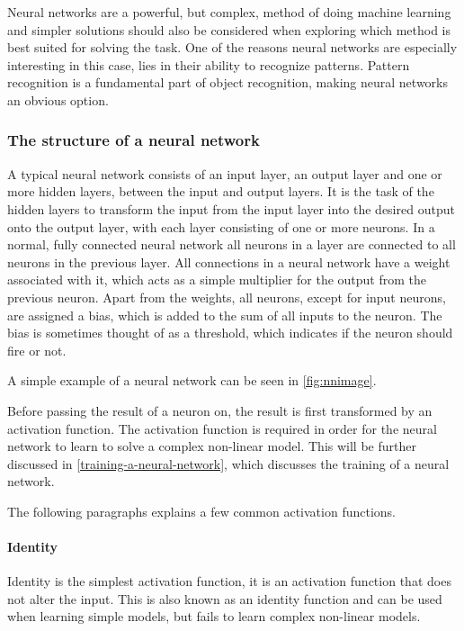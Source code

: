Neural networks are a powerful, but complex, method of doing machine learning and simpler solutions should also be considered when exploring which method is best suited for solving the task.
One of the reasons neural networks are especially interesting in this case, lies in their ability to recognize patterns.
Pattern recognition is a fundamental part of object recognition, making neural networks an obvious option.

\subsubsection{The structure of a neural network}
A typical neural network consists of an input layer, an output layer and one or more hidden layers, between the input and output layers.
It is the task of the hidden layers to transform the input from the input layer into the desired output onto the output layer, with each layer consisting of one or more neurons.
In a normal, fully connected neural network all neurons in a layer are connected to all neurons in the previous layer.
All connections in a neural network have a weight associated with it, which acts as a simple multiplier for the output from the previous neuron. 
Apart from the weights, all neurons, except for input neurons, are assigned a bias, which is added to the sum of all inputs to the neuron. 
The bias is sometimes thought of as a threshold, which indicates if the neuron should fire or not.

A simple example of a neural network can be seen in \autoref{fig:nnimage}.


Before passing the result of a neuron on, the result is first transformed by an activation function. 
The activation function is required in order for the neural network to learn to solve a complex non-linear model. 
This will be further discussed in \autoref{training-a-neural-network}, which discusses the training of a neural network.

The following paragraphs explains a few common activation functions.
\paragraph{Identity}
Identity is the simplest activation function, it is an activation function that does not alter the input. 
This is also known as an identity function and can be used when learning simple models, but fails to learn complex non-linear models.

